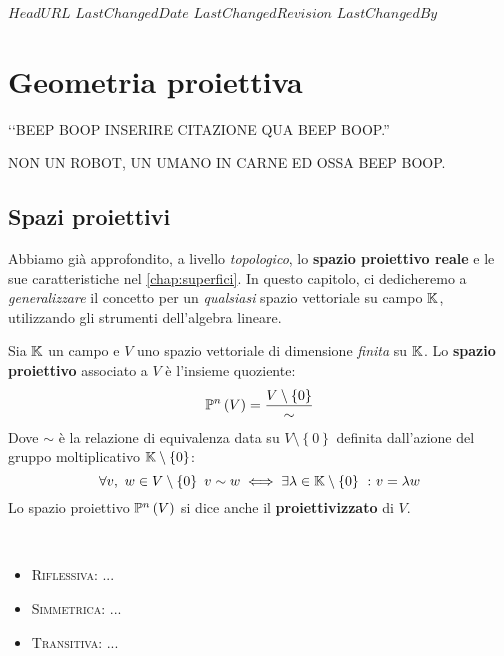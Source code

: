 \svnidlong
{$HeadURL$}
{$LastChangedDate$}
{$LastChangedRevision$}
{$LastChangedBy$}

\chapter{Geometria proiettiva}

\begin{introduction}
	‘‘BEEP BOOP INSERIRE CITAZIONE QUA BEEP BOOP.''
	\begin{flushright}
		\textsc{NON UN ROBOT,} UN UMANO IN CARNE ED OSSA BEEP BOOP.
	\end{flushright}
\end{introduction}

\section{Spazi proiettivi}
Abbiamo già approfondito, a livello \textit{topologico}, lo \textbf{spazio proiettivo reale} e le sue caratteristiche nel \autoref{chap:superfici}. In questo capitolo, ci dedicheremo a \textit{generalizzare} il concetto per un \textit{qualsiasi} spazio vettoriale su campo $\mathbb{K}$, utilizzando gli strumenti dell'algebra lineare. 
\begin{define}
Sia $\mathbb{K}$ un campo e $V$ uno spazio vettoriale di dimensione \textit{finita} su $\mathbb{K}$. Lo \textbf{spazio proiettivo} associato a $V$ è l'insieme quoziente:
\begin{equation}
	\proj{V}=\frac{V\setminus\left\{0\right\}}{\sim}
\end{equation}
Dove $\sim$ è la relazione di equivalenza data su $V\setminus\left\{0\right\}$ definita dall'azione del gruppo moltiplicativo $\mathbb{K}\setminus\left\{0\right\}$:
\begin{equation}
	\forall v,\ w\in V\setminus\left\{0\right\}\ v\sim w \iff \exists \lambda\in\kamp\setminus\left\{0\right\}\ \colon v=\lambda w
\end{equation}
Lo spazio proiettivo $\proj{V}$ si dice anche il \textbf{proiettivizzato} di $V$.
\end{define}
\begin{demonstration}
~{}
\begin{itemize}
	\item \textsc{Riflessiva}: ...
	\item \textsc{Simmetrica}: ...
	\item \textsc{Transitiva}: ...
\end{itemize}
\end{demonstration}
